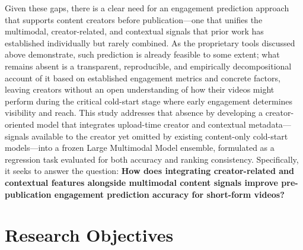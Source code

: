 Given these gaps, there is a clear need for an engagement prediction approach that supports content creators before publication—one that unifies the multimodal, creator-related, and contextual signals that prior work has established individually but rarely combined. As the proprietary tools discussed above demonstrate, such prediction is already feasible to some extent; what remains absent is a transparent, reproducible, and empirically decompositional account of it based on established engagement metrics and concrete factors, leaving creators without an open understanding of how their videos might perform during the critical cold-start stage where early engagement determines visibility and reach. This study addresses that absence by developing a creator-oriented model that integrates upload-time creator and contextual metadata—signals available to the creator yet omitted by existing content-only cold-start models—into a frozen Large Multimodal Model ensemble, formulated as a regression task evaluated for both accuracy and ranking consistency. Specifically, it seeks to answer the question: \textbf{How does integrating creator-related and contextual features alongside multimodal content signals improve pre-publication engagement prediction accuracy for short-form videos?}


\section{Research Objectives}



